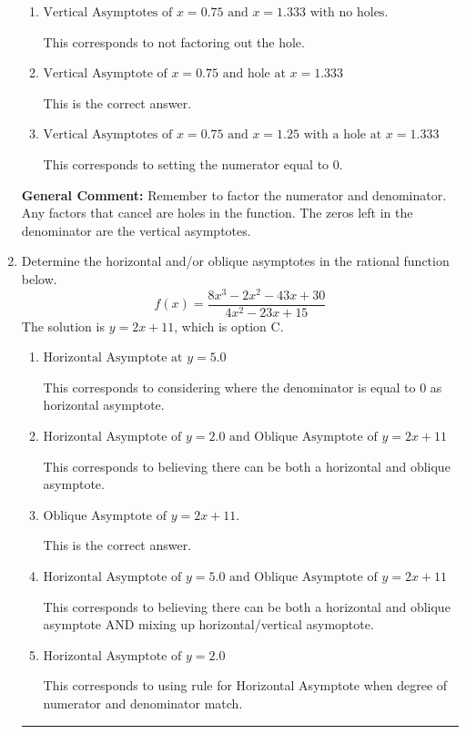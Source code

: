 \documentclass{extbook}[14pt]
\newcommand{\litem}[1]{\item #1

\rule{\textwidth}{0.4pt}}
\begin{document}
\begin{enumerate}
{\begin{enumerate}[label=\Alph*.]
This corresponds to considering where the denominator is equal to 0 as holes.
\item \( \text{Vertical Asymptotes of } x = 0.75 \text{ and } x = 1.333 \text{ with no holes.} \)

This corresponds to not factoring out the hole.
\item \( \text{Vertical Asymptote of } x = 0.75 \text{ and hole at } x = 1.333 \)

This is the correct answer.
\item \( \text{Vertical Asymptotes of } x = 0.75 \text{ and } x = 1.25 \text{ with a hole at } x = 1.333 \)

This corresponds to setting the numerator equal to 0.
\end{enumerate}

\textbf{General Comment:} Remember to factor the numerator and denominator. Any factors that cancel are holes in the function. The zeros left in the denominator are the vertical asymptotes.
}
\litem{
Determine the horizontal and/or oblique asymptotes in the rational function below.
\[ f(x) = \frac{8x^{3} -2 x^{2} -43 x + 30}{4x^{2} -23 x + 15} \]The solution is \( y = 2x + 11 \), which is option C.\begin{enumerate}[label=\Alph*.]
\item \( \text{Horizontal Asymptote at } y = 5.0 \)

This corresponds to considering where the denominator is equal to 0 as horizontal asymptote.
\item \( \text{Horizontal Asymptote of } y = 2.0 \text{ and Oblique Asymptote of } y = 2x + 11 \)

This corresponds to believing there can be both a horizontal and oblique asymptote.
\item \( \text{Oblique Asymptote of } y = 2x + 11. \)

This is the correct answer.
\item \( \text{Horizontal Asymptote of } y = 5.0 \text{ and Oblique Asymptote of } y = 2x + 11 \)

This corresponds to believing there can be both a horizontal and oblique asymptote AND mixing up horizontal/vertical asymoptote.
\item \( \text{Horizontal Asymptote of } y = 2.0  \)

This corresponds to using rule for Horizontal Asymptote when degree of numerator and denominator match.
\end{enumerate}

}
\end{enumerate}
\end{document}
